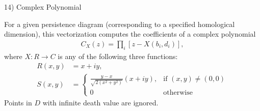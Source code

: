 \documentclass[conference, onecolumn]{IEEEtran}
\begin{document}
14) Complex Polynomial

For a given persistence diagram  (corresponding to a specified homological dimension), this vectorization computes the coefficients of a complex polynomial
\begin{align}
  C_X(z) = \prod_i \left[z - X\left(b_i, d_i\right)\right],
\end{align}
where $X: R \to C$ is any of the following three functions:
\begin{align}
  R(x, y) &= x + i y,\\
  S(x, y) &=
            \begin{cases}
              \frac{y-x}{\sqrt{2(x^2+y^2)}} (x+i y), & \textrm{if } (x,y) \ne (0,0) \\
              0 & \textrm{otherwise}
            \end{cases}
\end{align}
Points in $D$ with infinite death value are ignored.
\end{document}
